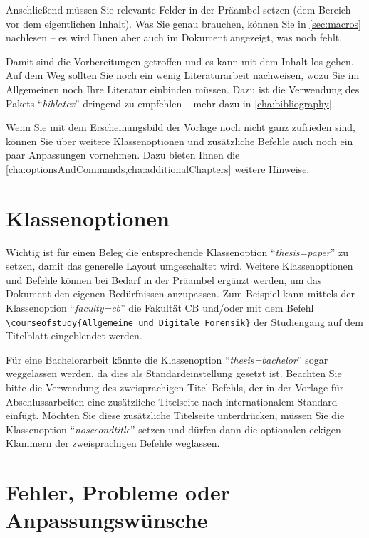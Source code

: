 \documentclass[
language=ngerman,	%
thesis=protokoll,		%
nomenclature,
%
	compactlistof,		%
%
	fancy,				%
%
%
	faculty=cb,			%
]{hsmw-vorlage-rw}
\begin{document}
	Anschließend müssen Sie relevante Felder in der Präambel setzen (dem Bereich vor dem eigentlichen Inhalt).
	Was Sie genau brauchen, können Sie in \cref{sec:macros} nachlesen -- es wird Ihnen aber auch im Dokument angezeigt, was noch fehlt.
	
	Damit sind die Vorbereitungen getroffen und es kann mit dem Inhalt los gehen.
	Auf dem Weg sollten Sie noch ein wenig Literaturarbeit nachweisen, wozu Sie im Allgemeinen noch Ihre Literatur einbinden müssen.
	Dazu ist die Verwendung des Pakets \enquote{\textit{biblatex}} dringend zu empfehlen -- mehr dazu in \cref{cha:bibliography}.
	
	Wenn Sie mit dem Erscheinungsbild der Vorlage noch nicht ganz zufrieden sind, können Sie über weitere Klassenoptionen und zusätzliche Befehle auch noch ein paar Anpassungen vornehmen.
	Dazu bieten Ihnen die \cref{cha:optionsAndCommands,cha:additionalChapters} weitere Hinweise.
	
	\section{Klassenoptionen}
	
	
	Wichtig ist für einen Beleg die entsprechende Klassenoption \enquote{\textit{thesis=paper}} zu setzen, damit das generelle Layout umgeschaltet wird.
	Weitere Klassenoptionen und Befehle können bei Bedarf in der Präambel ergänzt werden, um das Dokument den eigenen Bedürfnissen anzupassen.
	Zum Beispiel kann mittels der Klassenoption \enquote{\textit{faculty=cb}} die Fakultät CB und/oder mit dem Befehl \verb|\courseofstudy{Allgemeine und Digitale Forensik}| der Studiengang auf dem Titelblatt eingeblendet werden.
	
	
	Für eine Bachelorarbeit könnte die Klassenoption \enquote{\textit{thesis=bachelor}} sogar weggelassen werden, da dies als Standardeinstellung gesetzt ist.
	Beachten Sie bitte die Verwendung des zweisprachigen Titel-Befehls, der in der Vorlage für Abschlussarbeiten eine zusätzliche Titelseite nach internationalem Standard einfügt.
	Möchten Sie diese zusätzliche Titelseite unterdrücken, müssen Sie die Klassenoption \enquote{\textit{nosecondtitle}} setzen und dürfen dann die optionalen eckigen Klammern der zweisprachigen Befehle weglassen.
	
	\section{Fehler, Probleme oder Anpassungswünsche}
	
\end{document}
